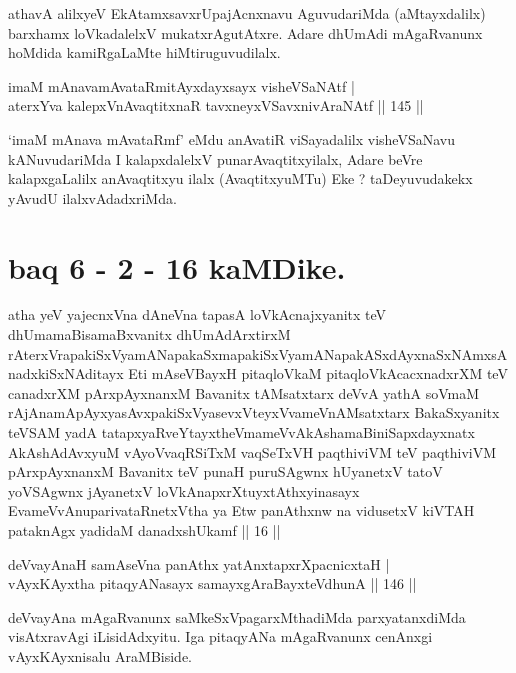 \begin{artha}
athavA alilxyeV EkAtamxsavxrUpajAcnxnavu AguvudariMda (aMtayxdalilx)
barxhamx loVkadalelxV mukatxrAgutAtxre. Adare dhUmAdi mAgaRvanunx
hoMdida kamiRgaLaMte hiMtiruguvudilalx.
\end{artha}


\begin{shl}
imaM mAnavamAvataRmitAyxdayxsayx visheVSaNAtf | \\
aterxYva kalepxV\s nAvaqtitxnaR tavxneyxVSavxnivAraNAtf \hfill|| 145 || 
\end{shl}

\begin{artha}
`imaM mAnava mAvataRmf' eMdu anAvatiR viSayadalilx visheVSaNavu  kANuvudariMda I kalapxdalelxV punarAvaqtitxyilalx, Adare beVre  kalapxgaLalilx anAvaqtitxyu ilalx (AvaqtitxyuMTu) Eke ? taDeyuvudakekx  yAvudU ilalxvAdadxriMda.
\end{artha}

\section*{baq 6 - 2 - 16 kaMDike.}

\begin{shl}
atha yeV yajecnxVna dAneVna tapasA loVkAcnajxyanitx teV dhUmamaBisamaBxvanitx dhUmAdArxtirxM rAterxVrapakiSxVyamANapakaSxmapakiSxVyamANapakASxdAyxnaSxNAmxsAnadxkiSxNAditayx Eti mAseVBayxH pitaqloVkaM pitaqloVkAcacxnadxrXM teV canadxrXM pArxpAyxnanxM Bavanitx tAMsatxtarx deVvA yathA soVmaM rAjAnamApAyxyasAvxpakiSxVyasevxVteyxVvameVnAMsatxtarx BakaSxyanitx teVSAM yadA tatapxyaRveYtayxtheVmameVvAkAshamaBiniSapxdayxnatx AkAshAdAvxyuM vAyoVvaqRSiTxM vaqSeTxVH paqthiviVM teV paqthiviVM pArxpAyxnanxM Bavanitx teV punaH puruSAgwnx hUyanetxV tatoV yoVSAgwnx jAyanetxV loVkAnapxrXtuyxtAthxyinasayx EvameVvAnuparivataRnetxV\s tha ya Etw panAthxnw na vidusetxV kiVTAH pataknAgx yadidaM danadxshUkamf || 16 ||
\end{shl}

\begin{shl}
deVvayAnaH samAseVna panAthx yatAnxtapxrXpacnicxtaH | \\
vAyxKAyx\s tha pitaqyANasayx samayxgAraBayxteV\s dhunA \hfill|| 146 || 
\end{shl}

\begin{artha}
deVvayAna mAgaRvanunx saMkeSxVpagarxMthadiMda parxyatanxdiMda
visAtxravAgi iLisidAdxyitu. Iga pitaqyANa mAgaRvanunx cenAnxgi
vAyxKAyxnisalu AraMBiside.
\end{artha}

